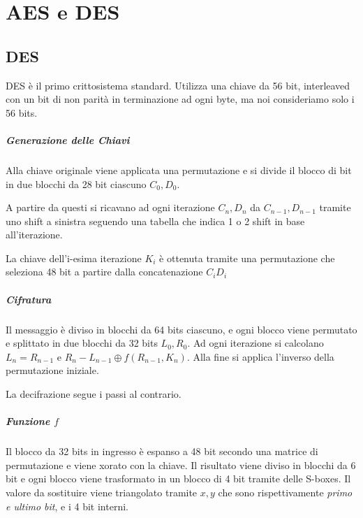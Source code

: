 \chapter{AES e DES}

\section{DES}

DES \`e il primo crittosistema standard. Utilizza una chiave da 56 bit, interleaved con un bit di non parit\`a in terminazione ad ogni byte, ma noi consideriamo solo i 56 bits.

\paragraph{Generazione delle Chiavi}

Alla chiave originale viene applicata una permutazione e si divide il blocco di bit in due blocchi da 28 bit ciascuno $C_0, D_0$.

A partire da questi si ricavano ad ogni iterazione $C_n, D_n$ da $C_{n-1}, D_{n-1}$ tramite uno shift a sinistra seguendo una tabella che indica 1 o 2 shift in base all'iterazione.

La chiave dell'i-esima iterazione $K_i$ \`e ottenuta tramite una permutazione che seleziona 48 bit a partire dalla concatenazione $C_iD_i$

\paragraph{Cifratura}

Il messaggio \`e diviso in blocchi da 64 bits ciascuno, e ogni blocco viene permutato e splittato in due blocchi da 32 bits $L_0, R_0$.
Ad ogni iterazione si calcolano $L_n = R_{n-1}$ e $R_{n} - L_{n-1} \oplus f(R_{n-1}, K_n)$. Alla fine si applica l'inverso della permutazione iniziale.

La decifrazione segue i passi al contrario.

\paragraph{Funzione $f$}

Il blocco da 32 bits in ingresso \`e espanso a 48 bit secondo una matrice di permutazione e viene xorato con la chiave. Il risultato viene diviso in blocchi da 6 bit e ogni blocco viene trasformato in un blocco di 4 bit tramite delle S-boxes. Il valore da sostituire viene triangolato tramite $x, y$ che sono rispettivamente \textit{primo e ultimo bit}, e i 4 bit interni.

